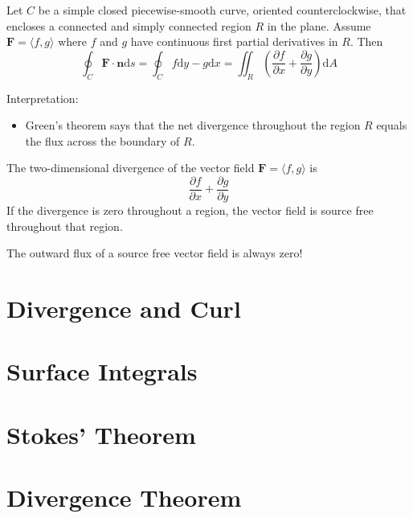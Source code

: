 \documentclass[../calc3.tex]{subfiles}
\begin{document}
\begin{theorem}
    Let $C$ be a simple closed piecewise-smooth curve, oriented counterclockwise, that encloses a connected and simply connected region $R$ in the plane.
    Assume $\textbf{F}=\langle f,g\rangle$ where $f$ and $g$ have continuous first partial derivatives in $R$. Then 
    \[\oint_C \textbf{F}\cdot\textbf{n}\mathrm{d}s=\oint_C f\mathrm{d}y-g\mathrm{d}x=\iint_R \left(\frac{\partial f}{\partial x}+\frac{\partial g}{\partial y}\right)\mathrm{d}A\]
\end{theorem}
Interpretation: 
\begin{itemize}
    \item Green's theorem says that the net divergence throughout the region $R$ equals the flux across the boundary of $R$.
\end{itemize}

\begin{definition}
    The two-dimensional divergence of the vector field $\textbf{F}=\langle f,g\rangle$ is 
    \[\frac{\partial f}{\partial x}+\frac{\partial g}{\partial y}\]
    If the divergence is zero throughout a region, the vector field is source free throughout that region.
\end{definition}

The outward flux of a source free vector field is always zero!



\section{Divergence and Curl}
\section{Surface Integrals}
\section{Stokes' Theorem}
\section{Divergence Theorem}
\end{document}
